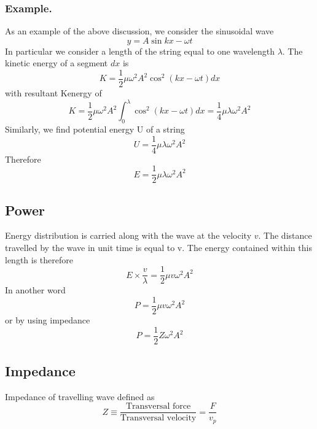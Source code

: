 \documentclass[../../../main.tex]{subfiles}
\begin{document}
\subsubsection{Example.} As an example of the above discussion, we consider the sinusoidal wave
\begin{equation*}
    y=A\sin kx-\omega t
\end{equation*}
In particular we consider a length of the string equal to one wavelength $\lambda$. The kinetic energy of a segment $dx$ is
\begin{equation*}
    K=\frac{1}{2}\mu\omega^2 A^2 \cos^2 (kx-\omega t) dx
\end{equation*}
with resultant Kenergy of
\begin{equation*}
    K=\frac{1}{2}\mu\omega^2 A^2\int_{0}^{\lambda}\cos^2 (kx-\omega t) dx=\frac{1}{4}\mu\lambda\omega^2 A^2
\end{equation*}
Similarly, we find potential energy U of a string 
\begin{equation*}
    U=\frac{1}{4}\mu\lambda\omega^2 A^2
\end{equation*}
Therefore
\begin{equation*}
    E=\frac{1}{2}\mu\lambda\omega^2 A^2
\end{equation*}

\subsection*{Power}
Energy distribution is carried along with the wave at the velocity $v$. The distance travelled by the wave in unit time is equal to v. The energy contained within this length is therefore
\begin{equation*}
    E\times \frac{v}{\lambda}=\frac{1}{2}\mu v\omega^2 A^2
\end{equation*}
In another word
\begin{equation*}
    P=\frac{1}{2}\mu v\omega^2 A^2
\end{equation*}
or by using impedance
\begin{equation*}
    P=\frac{1}{2}Z\omega^2 A^2
\end{equation*}

\subsection*{Impedance}
Impedance of travelling wave defined as 
\begin{equation*}
    Z\equiv\frac{\text{Transversal force}}{\text{Transversal velocity}} = \frac{F}{v_p}
\end{equation*}
\end{document}
